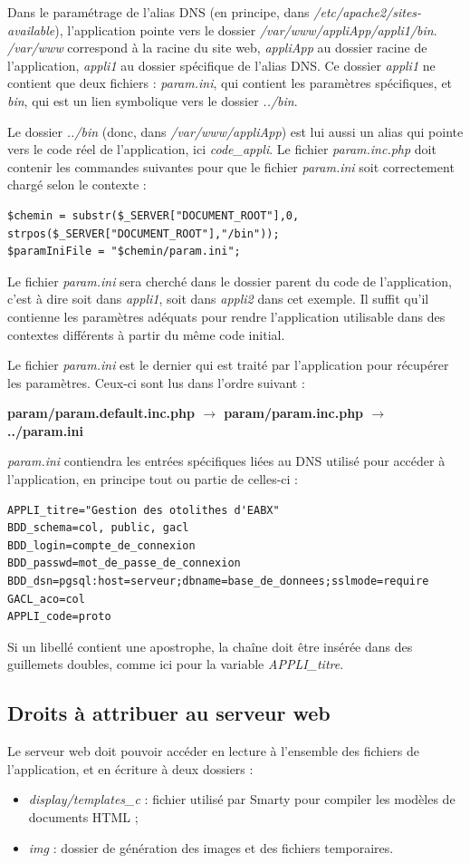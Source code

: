 Dans le paramétrage de l’alias DNS (en principe, dans \textit{/etc/apache2/sites-available}), l’application pointe vers le dossier \textit{/var/www/appliApp/appli1/bin}. \textit{/var/www} correspond à la racine du site web, \textit{appliApp} au dossier racine de l’application, \textit{appli1} au dossier spécifique de l’alias DNS. Ce dossier \textit{appli1} ne contient que deux fichiers : \textit{param.ini}, qui contient les paramètres spécifiques, et \textit{bin}, qui est un lien symbolique vers le dossier \textit{../bin}.

Le dossier \textit{../bin} (donc, dans\textit{ /var/www/appliApp}) est lui aussi un alias qui pointe vers le code réel de l’application, ici \textit{code\_appli}. Le fichier \textit{param.inc.php} doit contenir les commandes suivantes pour que le fichier \textit{param.ini} soit correctement chargé selon le contexte :
\begin{lstlisting}
$chemin = substr($_SERVER["DOCUMENT_ROOT"],0, strpos($_SERVER["DOCUMENT_ROOT"],"/bin"));
$paramIniFile = "$chemin/param.ini";
\end{lstlisting}

Le fichier \textit{param.ini} sera cherché dans le dossier parent du code de l’application, c’est à dire soit dans \textit{appli1}, soit dans \textit{appli2} dans cet exemple. Il suffit qu’il contienne les paramètres adéquats pour rendre l’application utilisable dans des contextes différents à partir du même code initial.

Le fichier \textit{param.ini} est le dernier qui est traité par l'application pour récupérer les paramètres. Ceux-ci sont lus dans l'ordre suivant :

\textbf{param/param.default.inc.php $\rightarrow$ param/param.inc.php $\rightarrow$ ../param.ini}

\textit{param.ini} contiendra les entrées spécifiques liées au DNS utilisé pour accéder à l'application, en principe tout ou partie de celles-ci :
\begin{lstlisting}
APPLI_titre="Gestion des otolithes d'EABX"
BDD_schema=col, public, gacl
BDD_login=compte_de_connexion
BDD_passwd=mot_de_passe_de_connexion
BDD_dsn=pgsql:host=serveur;dbname=base_de_donnees;sslmode=require
GACL_aco=col
APPLI_code=proto
\end{lstlisting}

Si un libellé contient une apostrophe, la chaîne doit être insérée dans des guillemets doubles, comme ici pour la variable \textit{APPLI\_titre}.


\subsection{Droits à attribuer au serveur web}
\label{droitsApache}
Le serveur web doit pouvoir accéder en lecture à l'ensemble des fichiers de l'application, et en écriture à deux dossiers :
\begin{itemize}
\item \textit{display/templates\_c} : fichier utilisé par Smarty pour compiler les modèles de documents HTML ;
\item \textit{img} : dossier de génération des images et des fichiers temporaires.
\end{itemize}

